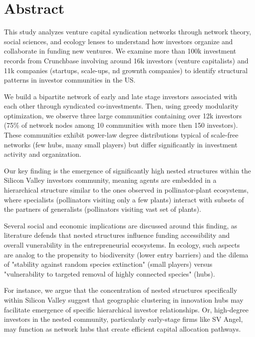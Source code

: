 \section*{Abstract}

This study analyzes venture capital syndication networks through network theory, social sciences, and ecology lenses to understand how investors organize and collaborate in funding new ventures. We examine more than 100k investment records from Crunchbase involving around 16k investors (venture capitalists) and 11k companies (startups, scale-ups, nd grownth companies) to identify structural patterns in investor communities in the US.

We build a bipartite network of early and late stage investors associated with each other through syndicated co-investments. Then, using greedy modularity optimization, we observe three large communities containing over 12k investors (75\% of network nodes among 10 communities with more then 150 investors). These communities exhibit power-law degree distributions typical of scale-free networks (few hubs, many small players) but differ significantly in investment activity and organization.

Our key finding is the emergence of significantly high nested structures within the Silicon Valley investors community, meaning agents are embedded in a hierarchical structure similar to the ones observed in pollinator-plant ecosystems, where specialists (pollinators visiting only a few plants) interact with subsets of the partners of generalists (pollinators visiting vast set of plants). 

Several social and economic implications are discussed around this finding, as literature defends that nested structures influence funding accessibility and overall vunerability in the entrepreneurial ecosystems. In ecology, such aspects are analog to the propensity to biodiversity (lower entry barriers) and the dilema of "stability against random species extinction" (small players) versus "vulnerability to targeted removal of highly connected species" (hubs).

For instance, we argue that the concentration of nested structures specifically within Silicon Valley suggest that geographic clustering in innovation hubs may facilitate emergence of specific hierarchical investor relationships. Or, high-degree investors in the nested community, particularly early-stage firms like SV Angel, may function as network hubs that create efficient capital allocation pathways. 

